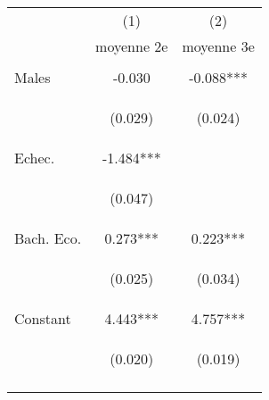 \documentclass{article} %
\begin{document}
\begin{table}[H]

\begin{center}
\begin{tabular}{lcc} \hline
 & (1) & (2) \\
 & moyenne 2e & moyenne 3e \\ \hline
\vspace{4pt} & \begin{footnotesize}\end{footnotesize} & \begin{footnotesize}\end{footnotesize} \\
Males & -0.030 & -0.088*** \\
\vspace{4pt} & \begin{footnotesize}(0.029)\end{footnotesize} & \begin{footnotesize}(0.024)\end{footnotesize} \\
Echec. & -1.484*** &  \\
\vspace{4pt} & \begin{footnotesize}(0.047)\end{footnotesize} & \begin{footnotesize}\end{footnotesize} \\
Bach. Eco. & 0.273*** & 0.223*** \\
\vspace{4pt} & \begin{footnotesize}(0.025)\end{footnotesize} & \begin{footnotesize}(0.034)\end{footnotesize} \\
Constant & 4.443*** & 4.757*** \\
 & \begin{footnotesize}(0.020)\end{footnotesize} & \begin{footnotesize}(0.019)\end{footnotesize} \\
\vspace{4pt} & \begin{footnotesize}\end{footnotesize} & \begin{footnotesize}\end{footnotesize} \\

\end{tabular}
\end{center}
\end{table}
\end{document}
